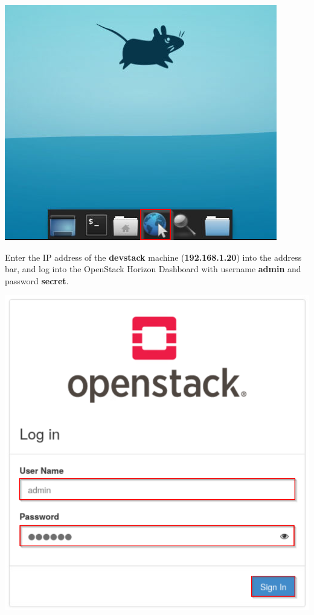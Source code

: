 \documentclass[letterpaper, 12pt]{article}
\begin{document}
\begin{enumerate}
\begin{labstep}
        \begin{center}
            \includegraphics[scale=0.75]{images/part1/step3.png}
        \end{center}
    \end{labstep}

    \begin{labstep}
        Enter the IP address of the \textbf{devstack} machine (\textbf{192.168.1.20}) into the address bar, and log into the OpenStack Horizon Dashboard with username \textbf{admin} and password \textbf{secret}.

        \begin{center}
            \includegraphics[scale=0.65]{images/part1/step4.png}
        \end{center}
    \end{labstep}


\end{enumerate}
\end{document}
